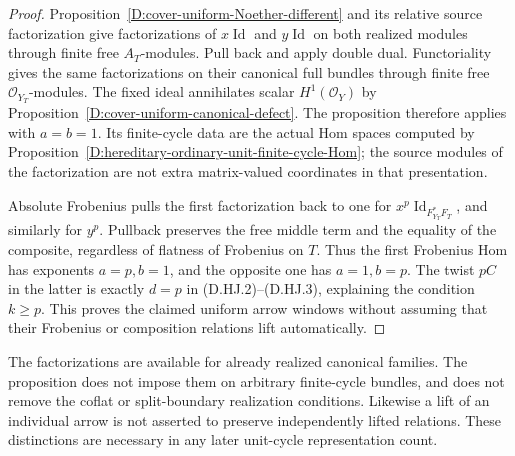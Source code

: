 \begin{proof}
Proposition~\ref{D:cover-uniform-Noether-different} and its
relative source factorization give factorizations of
$x\operatorname{Id}$ and $y\operatorname{Id}$ on both
realized modules through finite free $A_T$-modules. Pull
back and apply double dual. Functoriality gives the same
factorizations on their canonical full bundles through
finite free $\mathcal O_{Y_T}$-modules. The fixed ideal
annihilates scalar $H^1(\mathcal O_Y)$ by
Proposition~\ref{D:cover-uniform-canonical-defect}.
The proposition therefore applies with $a=b=1$.
Its finite-cycle data are the actual Hom spaces computed
by Proposition~\ref{D:hereditary-ordinary-unit-finite-cycle-Hom};
the source modules of the factorization are not extra
matrix-valued coordinates in that presentation.

Absolute Frobenius pulls the first factorization back to
one for $x^p\operatorname{Id}_{F_{Y_T}^*F_T}$, and similarly
for $y^p$. Pullback preserves the free middle term and
the equality of the composite, regardless of flatness of
Frobenius on $T$. Thus the first Frobenius Hom has exponents
$a=p,b=1$, and the opposite one has $a=1,b=p$.
The twist $pC$ in the latter is exactly $d=p$ in
(D.HJ.2)--(D.HJ.3), explaining the condition $k\ge p$.
This proves the claimed uniform arrow windows without
assuming that their Frobenius or composition relations
lift automatically.
\end{proof}

\begin{remark}
The factorizations are available for already realized
canonical families. The proposition does not impose them
on arbitrary finite-cycle bundles, and does not remove
the coflat or split-boundary realization conditions.
Likewise a lift of an individual arrow is not asserted
to preserve independently lifted relations. These
distinctions are necessary in any later unit-cycle
representation count.
\end{remark}
